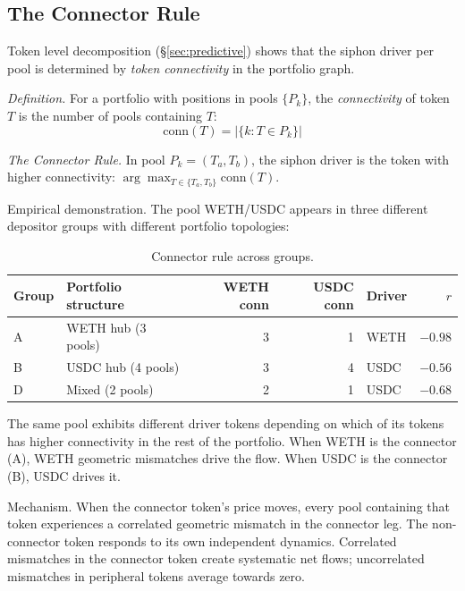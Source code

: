 \documentclass[11pt,a4paper]{article}
\begin{document}
\subsection{The Connector Rule}\label{sec:connector}

Token level decomposition (\S\ref{sec:predictive}) shows that the siphon driver per pool is determined by \emph{token connectivity} in the portfolio graph.

\emph{Definition.} For a portfolio with positions in pools $\{P_k\}$, the \emph{connectivity} of token $T$ is the number of pools containing $T$:
\begin{equation}\label{eq:connectivity}
\text{conn}(T) = \left|\{k : T \in P_k\}\right|
\end{equation}

\emph{The Connector Rule.} In pool $P_k = (T_a, T_b)$, the siphon driver is the token with higher connectivity: $\arg\max_{T \in \{T_a, T_b\}} \text{conn}(T)$.

Empirical demonstration. The pool WETH/USDC appears in three different depositor groups with different portfolio topologies:

\begin{table}[H]
\centering
\caption{Connector rule across groups.}\label{tab:connector-rule}
\begin{tabular}{@{}llrrlr@{}}
\toprule
Group & Portfolio structure & WETH conn & USDC conn & Driver & $r$ \\
\midrule
A & WETH hub (3 pools) & 3 & 1 & WETH & $-0.98$ \\
B & USDC hub (4 pools) & 3 & 4 & USDC & $-0.56$ \\
D & Mixed (2 pools)    & 2 & 1 & USDC & $-0.68$ \\
\bottomrule
\end{tabular}
\end{table}

The same pool exhibits different driver tokens depending on which of its tokens has higher connectivity in the rest of the portfolio. When WETH is the connector (A), WETH geometric mismatches drive the flow. When USDC is the connector (B), USDC drives it.

Mechanism. When the connector token's price moves, every pool containing that token experiences a correlated geometric mismatch in the connector leg. The non-connector token responds to its own independent dynamics. Correlated mismatches in the connector token create systematic net flows; uncorrelated mismatches in peripheral tokens average towards zero.
\end{document}

